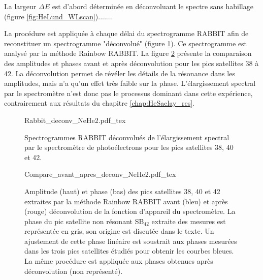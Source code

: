 La largeur $\Delta E$ est d'abord déterminée en déconvoluant le spectre sans habillage (figure \ref{fig:HeLund_WLscan}).......

La procédure est appliquée à chaque délai du spectrogramme RABBIT afin de reconstituer un spectrogramme "déconvolué" (figure \ref{fig:Rabbit_HeLund_2s2p_deconv}). Ce spectrogramme est analysé par la méthode Rainbow RABBIT. La figure \ref{fig:Resultats_NeHe2_deconv} présente la comparaison des amplitudes et phases avant et après déconvolution pour les pics satellites 38 à 42. La déconvolution permet de révéler les détails de la résonance dans les amplitudes, mais n'a qu'un effet très faible sur la phase. L'élargissement spectral par le spectromètre n'est donc pas le processus dominant dans cette expérience, contrairement aux résultats du chapitre \ref{chap:HeSaclay_res}. 

\begin{figure}
\centering
\def\svgwidth{0.95\textwidth}
{Rabbit_deconv_NeHe2.pdf_tex}
\caption{Spectrogrammes RABBIT déconvolués de l'élargissement spectral par le spectromètre de photoélectrons pour les pics satellites 38, 40 et 42.}
\label{fig:Rabbit_HeLund_2s2p_deconv}
\end{figure}

\begin{figure}
\centering
\def\svgwidth{\textwidth}
{Compare_avant_apres_deconv_NeHe2.pdf_tex}
\caption{Amplitude (haut) et phase (bas) des pics satellites 38, 40 et 42 extraites par la méthode Rainbow RABBIT avant (bleu) et après (rouge) déconvolution de la fonction d'appareil du spectromètre. La phase du pic satellite non résonant SB$_{42}$ extraite des mesures est représentée en gris, son origine est discutée dans le texte. Un ajustement de cette phase linéaire est soustrait aux phases mesurées dans les trois pics satellites étudiés pour obtenir les courbes bleues. La même procédure est appliquée aux phases obtenues après déconvolution (non représenté).}
\label{fig:Resultats_NeHe2_deconv}
\end{figure}

